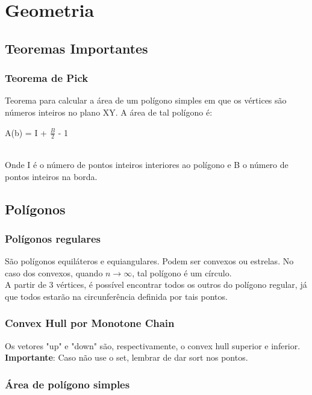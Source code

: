 \section{Geometria}

\subsection{Teoremas Importantes}

\subsubsection{Teorema de Pick}
Teorema para calcular a \'{a}rea de um pol\'{i}gono simples em que os v\'{e}rtices são n\'{u}meros inteiros no plano XY. A \'{a}rea de tal pol\'{i}gono é: 
\\\centerline{A(b) = I + $\frac{B}{2}$ - 1}
\\Onde I \'{e} o n\'{u}mero de pontos inteiros interiores ao pol\'{i}gono e B o n\'{u}mero de pontos inteiros na borda.
\divisor



\subsection{Pol\'{i}gonos}
\subsubsection{Pol\'{i}gonos regulares}
S\~{a}o pol\'{i}gonos equil\'{a}teros e equiangulares. Podem ser convexos ou estrelas. No caso dos convexos, quando $n\rightarrow\infty$, tal pol\'{i}gono \'{e} um c\'{i}rculo.
\\ A partir de 3 v\'{e}rtices, \'{e} poss\'{i}vel encontrar todos os outros do pol\'{i}gono regular, j\'{a} que todos estar\~{a}o na circunfer\^{e}ncia definida por tais pontos. 
\divisor

\subsubsection{Convex Hull por Monotone Chain}
Os vetores "up" e "down" s\~{a}o, respectivamente, o convex hull superior e inferior.
\\ \textbf{Importante}: Caso n\~{a}o use o set, lembrar de dar sort nos pontos.
\divisor

\subsubsection{\'{A}rea de pol\'{i}gono simples}
\divisor


